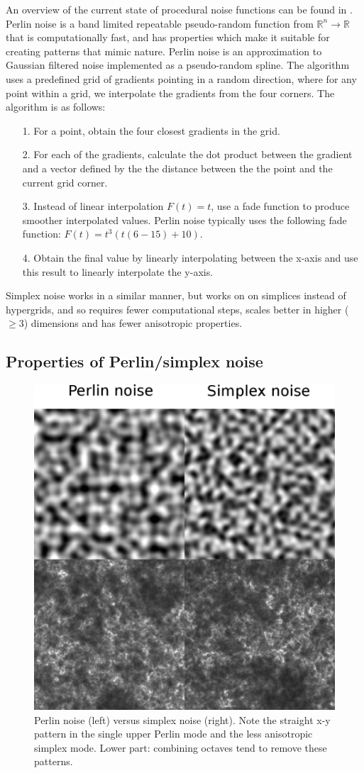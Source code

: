 \documentclass[aps,pre,twocolumn,letterpaper,floatfix,showpacs]{revtex4}
\begin{document}
An overview of the current state of procedural noise functions can be
found in \cite{lagae2010state}. Perlin noise is a band limited repeatable pseudo-random function
from $\mathbb R^n \to \mathbb R$ that is computationally fast, and has
properties which make it suitable for creating patterns that mimic
nature. Perlin noise is an approximation to Gaussian filtered noise
implemented as a pseudo-random spline. The algorithm uses a predefined
grid of gradients pointing in a random direction, where for any point
within a grid, we interpolate the gradients from the four corners. The
algorithm is as follows:
\begin{itemize}
  \item[1.] For a point, obtain the four closest gradients in the grid.
   \item [2.] For each of the gradients, calculate the dot product
     between the gradient and a vector defined by the  the distance
     between the the point and the current grid corner. 
   \item [3.] Instead of linear interpolation $F(t) = t$, use a fade function to produce
   smoother interpolated values. Perlin noise typically uses the following fade function: $F(t) = t ^3 (t  (6 - 15) + 10)$.
    \item [4.] Obtain the final value by linearly interpolating between the x-axis and
      use this result to linearly interpolate the y-axis. 
\end{itemize} 
Simplex noise works in a similar manner, but works on on simplices instead of hypergrids,
and so requires fewer computational steps, scales better in higher ($\ge 3$) dimensions
and has fewer anisotropic properties. 

\subsection{Properties of Perlin/simplex noise}
\begin{figure}
\includegraphics[width=.5\textwidth]{fig1.eps}
\caption{Perlin noise (left) versus simplex noise (right). Note the
  straight x-y pattern in the single upper Perlin mode and the less
  anisotropic simplex mode. Lower part: combining octaves tend
  to remove these patterns.}
\label{fig:noise}
\end{figure}
\end{document}
